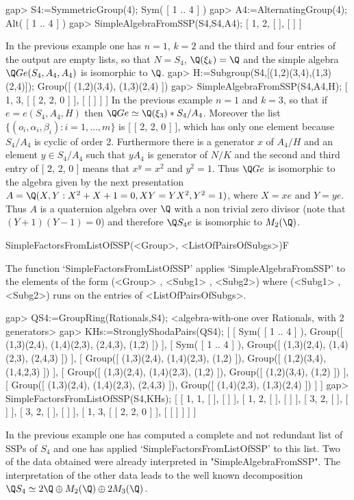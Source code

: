 \beginexample
    gap> S4:=SymmetricGroup(4);
    Sym( [ 1 .. 4 ] )
    gap> A4:=AlternatingGroup(4);
    Alt( [ 1 .. 4 ] )
    gap> SimpleAlgebraFromSSP(S4,S4,A4);
    [ 1, 2, [  ], [  ] ]
\endexample

In the previous example one has $n=1$, $k=2$ and the third and four 
entries of the output are empty lists, so that $N=S_4$, $\Q(\xi_k)=\Q$ and 
the simple algebra $\Q Ge(S_4,A_4,A_4)$ is isomorphic to $\Q$. 
\beginexample
    gap> H:=Subgroup(S4,[(1,2)(3,4),(1,3)(2,4)]);
    Group([ (1,2)(3,4), (1,3)(2,4) ])
    gap> SimpleAlgebraFromSSP(S4,A4,H);
    [ 1, 3, [ [ 2, 2, 0 ] ], [ [  ] ] ]
\endexample
In the previous example $n=1$ and $k=3$, so that if $e=e(S_4,A_4,H)$ then 
$\Q Ge\simeq \Q(\xi_3)*S_4/A_4$. 
Moreover the list $\{(o_i,\alpha_i,\beta_i):i=1,\ldots,m\}$ is [ [ 2, 2, 0 ] ], 
which has only one element because $S_4/A_4$ is cyclic of order 2. Furthermore there 
is a generator $x$ of $A_4/H$ and an element $y\in S_4/A_4$ such that $yA_4$ is generator of 
$N/K$ and the second and third entry of [ 2, 2, 0 ] means that $x^y= x^2$ and 
$y^2=1$. Thus $\Q Ge$ is isomorphic to the algebra given by the next 
presentation $A=\Q(X,Y: X^2+X+1=0,XY=YX^2,Y^2=1)$, where $X=xe$ and $Y=ye$. Thus 
$A$ is a quaternion algebra over $\Q$ with a non trivial zero divisor (note that 
$(Y+1)(Y-1)=0$) and therefore $\Q S_4 e$ is isomorphic to $M_2(\Q)$. 

\>SimpleFactorsFromListOfSSP(<Group>, <ListOfPairsOfSubgs>)F

The function `SimpleFactorsFromListOfSSP' applies `SimpleAlgebraFromSSP' to the elements of 
the form (<Group> , <Subg1> , <Subg2>) where (<Subg1> , <Subg2>) runs on the entries of 
<ListOfPairsOfSubgs>.


\beginexample
    gap> QS4:=GroupRing(Rationals,S4);
    <algebra-with-one over Rationals, with 2 generators>
    gap> KHs:=StronglyShodaPairs(QS4);
    [ [ Sym( [ 1 .. 4 ] ), Group([ (1,3)(2,4), (1,4)(2,3), (2,4,3), (1,2) ]) ],
    [ Sym( [ 1 .. 4 ] ), Group([ (1,3)(2,4), (1,4)(2,3), (2,4,3) ]) ],
    [ Group([ (1,3)(2,4), (1,4)(2,3), (1,2) ]),
        Group([ (1,2)(3,4), (1,4,2,3) ]) ],
    [ Group([ (1,3)(2,4), (1,4)(2,3), (1,2) ]), Group([ (1,2)(3,4), (1,2) ]) ],
    [ Group([ (1,3)(2,4), (1,4)(2,3), (2,4,3) ]),
        Group([ (1,4)(2,3), (1,3)(2,4) ]) ] ]
    gap> SimpleFactorsFromListOfSSP(S4,KHs);
    [ [ 1, 1, [  ], [  ] ], [ 1, 2, [  ], [  ] ], [ 3, 2, [  ], [  ] ],
    [ 3, 2, [  ], [  ] ], [ 1, 3, [ [ 2, 2, 0 ] ], [ [  ] ] ] ]
\endexample

In the previous example one has computed a complete and not redundant list of SSPs of $S_4$ and 
one has applied `SimpleFactorsFromListOfSSP' to this list. Two of the data obtained were 
already interpreted in "SimpleAlgebraFromSSP". The interpretation of the other data leads to 
the well known decomposition $\Q S_4 \simeq 2\Q \oplus M_2(\Q) \oplus 2 M_3(\Q)$. 


